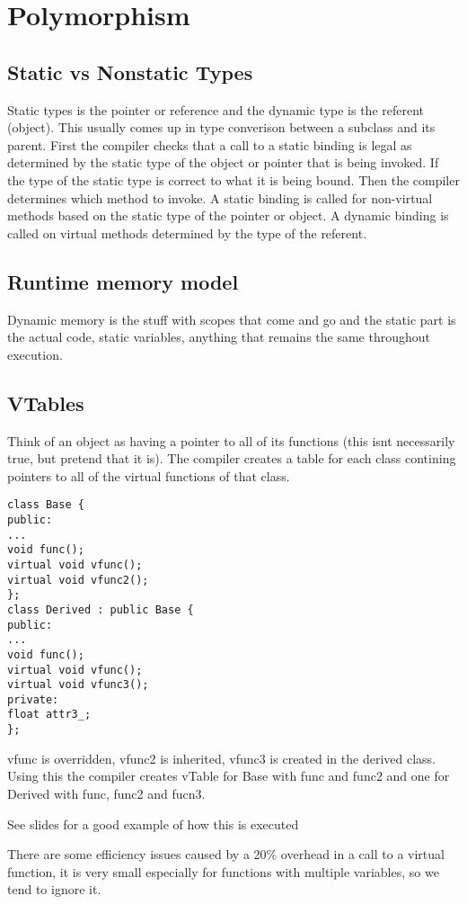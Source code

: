 \documentclass[12pt]{article}
\begin{document}
\section*{Polymorphism}
\subsection*{Static vs Nonstatic Types}
Static types is the pointer or reference and the dynamic type is the referent (object). This usually comes up in type converison between a subclass and its parent. First the compiler checks that a call to a static binding is legal as determined by the static type of the object or pointer that is being invoked. If the type of the static type is correct to what it is being bound. Then the compiler determines which method to invoke. A static binding is called for non-virtual methods based on the static type of the pointer or object.  A dynamic binding is called on virtual methods determined by the type of the referent. 

\subsection*{Runtime memory model}
Dynamic memory is the stuff with scopes that come and go and the static part is the actual code, static variables, anything that remains the same throughout execution.

\subsection*{VTables}
Think of an object as having a pointer to all of its functions (this isnt necessarily true, but pretend that it is). The compiler creates a table for each class contining pointers to all of the virtual functions of that class.
\begin{verbatim}
class Base {
public:
...
void func();
virtual void vfunc();
virtual void vfunc2();
};
class Derived : public Base {
public:
...
void func();
virtual void vfunc();
virtual void vfunc3();
private:
float attr3_;
};
\end{verbatim}
vfunc is overridden, vfunc2 is inherited, vfunc3 is created in the derived class. Using this the compiler creates vTable for Base with func and func2 and one for Derived with func, func2 and fucn3.

See slides for a good example of how this is executed

There are some efficiency issues caused by a 20\% overhead in a call to a virtual function, it is very small especially for functions with multiple variables, so we tend to ignore it.
\end{document}
